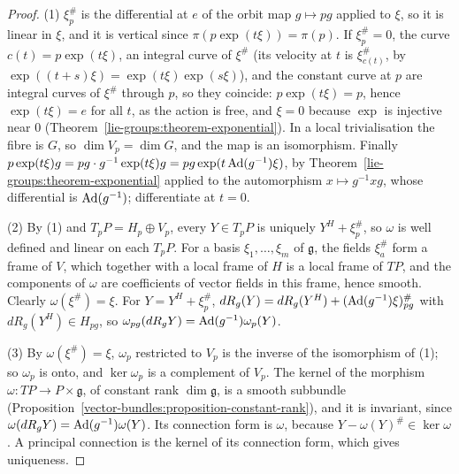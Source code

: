 \begin{proof}
(1) $\xi^\#_p$ is the differential at $e$ of the orbit map $g \mapsto pg$ applied to $\xi$, so it is linear in $\xi$, and it is vertical since $\pi(p\exp(t\xi)) = \pi(p)$. If $\xi^\#_p = 0$,
the curve $c(t) = p\exp(t\xi)$, an integral curve of $\xi^\#$ (its velocity at $t$ is $\xi^\#_{c(t)}$, by $\exp((t + s)\xi) = \exp(t\xi)\exp(s\xi)$), and the constant curve at $p$ are integral
curves of $\xi^\#$ through $p$, so they coincide: $p\exp(t\xi) = p$, hence $\exp(t\xi) = e$ for all $t$, as the action is free, and $\xi = 0$ because $\exp$ is injective near $0$
(Theorem~\ref{lie-groups:theorem-exponential}). In a local trivialisation the fibre is $G$, so $\dim V_p = \dim G$, and the map is an isomorphism. Finally
$p\exp(t\xi)g = pg \cdot g^{-1}\exp(t\xi)g = pg\exp(t\operatorname{Ad}(g^{-1})\xi)$, by Theorem~\ref{lie-groups:theorem-exponential} applied to the automorphism $x \mapsto g^{-1}xg$, whose differential
is $\operatorname{Ad}(g^{-1})$; differentiate at $t = 0$.

(2) By (1) and $T_pP = H_p \oplus V_p$, every $Y \in T_pP$ is uniquely $Y^H + \xi^\#_p$, so $\omega$ is well defined and linear on each $T_pP$. For a basis $\xi_1, \ldots, \xi_m$ of $\mathfrak{g}$,
the fields $\xi_a^\#$ form a frame of $V$, which together with a local frame of $H$ is a local frame of $TP$, and the components of $\omega$ are coefficients of vector fields in this
frame, hence smooth. Clearly $\omega(\xi^\#) = \xi$. For $Y = Y^H + \xi^\#_p$, $dR_g(Y) = dR_g(Y^H) + (\operatorname{Ad}(g^{-1})\xi)^\#_{pg}$ with $dR_g(Y^H) \in H_{pg}$, so
$\omega_{pg}(dR_gY) = \operatorname{Ad}(g^{-1})\omega_p(Y)$.

(3) By $\omega(\xi^\#) = \xi$, $\omega_p$ restricted to $V_p$ is the inverse of the isomorphism of (1); so $\omega_p$ is onto, and $\ker\omega_p$ is a complement of $V_p$. The kernel of the
morphism $\omega \colon TP \to P \times \mathfrak{g}$, of constant rank $\dim\mathfrak{g}$, is a smooth subbundle (Proposition~\ref{vector-bundles:proposition-constant-rank}), and it is invariant,
since $\omega(dR_gY) = \operatorname{Ad}(g^{-1})\omega(Y)$. Its connection form is $\omega$, because $Y - \omega(Y)^\# \in \ker\omega$. A principal connection is the kernel of its connection form, which
gives uniqueness.
\end{proof}

